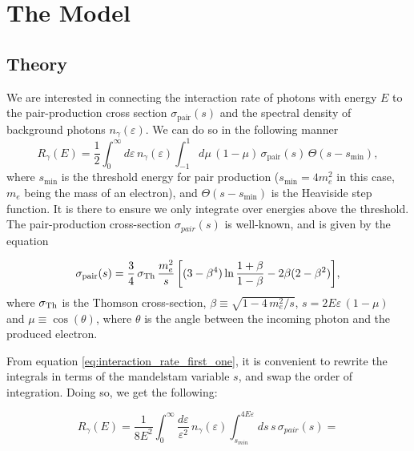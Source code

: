 \chapter{The Model}
\label{chap:The Model}

\section{Theory}

We are interested in connecting the interaction rate of photons with energy $E$ to the pair-production cross section $\sigma_{\text{pair}}(s)$ and the spectral density of background photons $n_{\gamma}(\varepsilon)$. We can do so in the following manner\begin{equation}
    R_{\gamma}(E) = \frac{1}{2}\int_{0}^{\infty}d\varepsilon \,n_{\gamma}(\varepsilon)\int_{-1}^{1}d\mu\,(1-\mu)\,\sigma_{\text{pair}}(s)\,\Theta(s-s_{\min}),
    \label{eq:interaction_rate_first_one}
\end{equation} where $s_{\min}$ is the threshold energy for pair production ($s_{\min} = 4m_e^2$ in this case, $m_e$ being the mass of an electron), and $\Theta(s-s_{\min})$ is the Heaviside step function. It is there to ensure we only integrate over energies above the threshold. The pair-production cross-section $\sigma_{pair}(s)$ is well-known, and is given by the equation

\begin{equation}
    \sigma_{\rm pair}(s)=\frac{3}{4}\,\sigma_{{\rm Th}}\, \frac{m_e^2}{s}
     \left[(3-\beta^{4})\ln\frac{1+\beta}{1-\beta}-2\beta(2-\beta^{2})\right]\!,
    \label{eq:sigma-pair}
\end{equation} where $\sigma_{\rm Th}$ is the Thomson cross-section, $\beta \equiv \sqrt{1-4\,m_e^2/s}$, $s = 2E\varepsilon\,(1-\mu)$ and $\mu \equiv \cos(\theta)$, where $\theta$ is the angle between the incoming photon and the produced electron.

From equation \eqref{eq:interaction_rate_first_one}, it is convenient to rewrite the integrals in terms of the mandelstam variable $s$, and swap the order of integration. Doing so, we get the following:


\newpage

\begin{equation*}
    R_{\gamma}(E) = \frac{1}{8E^2}\int_{0}^{\infty}\frac{d\varepsilon}{\varepsilon^2}\,n_{\gamma}(\varepsilon)\int_{s_{min}}^{4E\varepsilon}ds\,s\,\sigma_{pair}(s) =
    \label{eq:interaction_rate_second_one}
\end{equation*}

